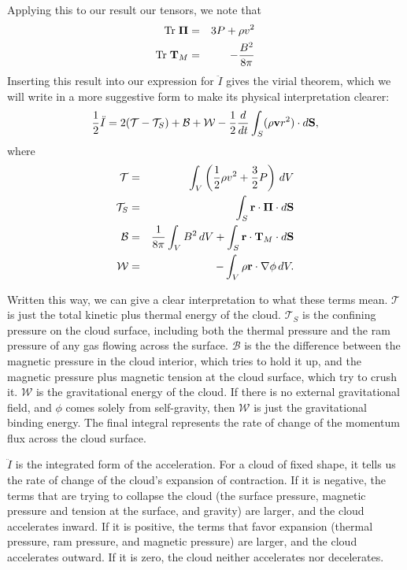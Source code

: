 Applying this to our result our tensors, we note that
\begin{eqnarray}
\mbox{Tr}\; \boldsymbol{\Pi} & = & 3P + \rho v^2 \\
\mbox{Tr}\; \mathbf{T}_M & = & -\frac{B^2}{8\pi}
\end{eqnarray}
Inserting this result into our expression for $\ddot{I}$ gives the virial theorem, which we will write in a more suggestive form to make its physical interpretation clearer:
\begin{equation}
\frac{1}{2}\ddot{I} = 2(\mathcal{T} - \mathcal{T}_S) + \mathcal{B} + \mathcal{W} - \frac{1}{2}\frac{d}{dt} \int_S (\rho\mathbf{v} r^2)\cdot d\mathbf{S},
\end{equation}
where
\begin{eqnarray}
\mathcal{T} & = & \int_V\left(\frac{1}{2}\rho v^2 + \frac{3}{2} P\right)\, dV \\
\mathcal{T}_S & = & \int_S \mathbf{r} \cdot \boldsymbol{\Pi} \cdot d\mathbf{S}\\
\mathcal{B} & = & \frac{1}{8\pi} \int_V B^2 \,dV + \int_S \mathbf{r}\cdot \mathbf{T}_M\cdot d\mathbf{S}\\
\mathcal{W} & = & -\int_V \rho \mathbf{r}\cdot\nabla\phi\,dV.
\end{eqnarray}

Written this way, we can give a clear interpretation to what these terms mean. $\mathcal{T}$ is just the total kinetic plus thermal energy of the cloud. $\mathcal{T}_S$ is the confining pressure on the cloud surface, including both the thermal pressure and the ram pressure of any gas flowing across the surface. $\mathcal{B}$ is the the difference between the magnetic pressure in the cloud interior, which tries to hold it up, and the magnetic pressure plus magnetic tension at the cloud surface, which try to crush it. $\mathcal{W}$ is the gravitational energy of the cloud. If there is no external gravitational field, and $\phi$ comes solely from self-gravity, then $\mathcal{W}$ is just the gravitational binding energy. The final integral represents the rate of change of the momentum flux across the cloud surface.

$\ddot{I}$ is the integrated form of the acceleration. For a cloud of fixed shape, it tells us the rate of change of the cloud's expansion of contraction. If it is negative, the terms that are trying to collapse the cloud (the surface pressure, magnetic pressure and tension at the surface, and gravity) are larger, and the cloud accelerates inward. If it is positive, the terms that favor expansion (thermal pressure, ram pressure, and magnetic pressure) are larger, and the cloud accelerates outward. If it is zero, the cloud neither accelerates nor decelerates.


